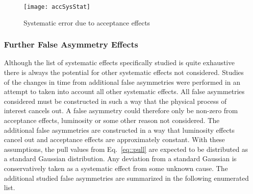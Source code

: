 \begin{figure}[h!t]
  \begin{center}
    \texttt{[image: accSysStat]}
    \caption{Systematic error due to acceptance effects}
    \label{fig::accSysStat}
  \end{center}
\end{figure}

\subsubsection{Further False Asymmetry Effects}
Although the list of systematic effects specifically studied is quite exhaustive
there is always the potential for other systematic effects not considered.
Studies of the changes in time from additional false asymmetries were performed
in an attempt to taken into account all other systematic effects.  All false
asymmetries considered must be constructed in such a way that the physical
process of interest cancels out.  A false asymmetry could therefore only be
non-zero from acceptance effects, luminosity or some other reason not
considered.  The additional false asymmetries are constructed in a way that
luminosity effects cancel out and acceptance effects are approximately constant.
With these assumptions, the pull values from Eq.~\ref{eq::pull} are expected to
be distributed as a standard Gaussian distribution.  Any deviation from a
standard Gaussian is conservatively taken as a systematic effect from some
unknown cause.  The additional studied false asymmetries are summarized in the
following enumerated list.

